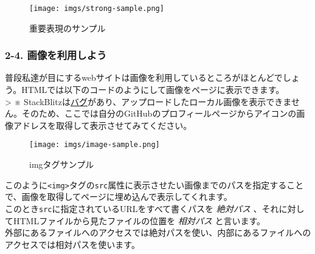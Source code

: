 \begin{Shaded}
\begin{Highlighting}[]
\DataTypeTok{\textless{}}\DataTypeTok{\textgreater{}}
  \DataTypeTok{\textless{}}\DataTypeTok{\textgreater{}}\DataTypeTok{\textless{}/}\DataTypeTok{\textgreater{}}
\DataTypeTok{\textless{}/}\DataTypeTok{\textgreater{}}
\end{Highlighting}
\end{Shaded}

\begin{figure}
\centering
\texttt{[image: imgs/strong-sample.png]}
\caption{重要表現のサンプル}
\end{figure}

\subsubsection{2-4.
画像を利用しよう}\label{ux753bux50cfux3092ux5229ux7528ux3057ux3088ux3046}

普段私達が目にするwebサイトは画像を利用しているところがほとんどでしょう。HTMLでは以下のコードのようにして画像をページに表示できます。\\
\textgreater{} ※
StackBlitzは\href{https://github.com/stackblitz/core/issues/1687}{バグ}があり、アップロードしたローカル画像を表示できません。そのため、ここでは自分のGitHubのプロフィールページからアイコンの画像アドレスを取得して表示させてみてください。

\begin{Shaded}
\begin{Highlighting}[]
\DataTypeTok{\textless{}}\OperatorTok{=}\ErrorTok{\textless{}}\OtherTok{ }\DataTypeTok{/\textgreater{}}
\end{Highlighting}
\end{Shaded}

\begin{figure}
\centering
\texttt{[image: imgs/image-sample.png]}
\caption{imgタグサンプル}
\end{figure}

このように\texttt{\textless{}img\textgreater{}}タグの\texttt{src}属性に表示させたい画像までのパスを指定することで、画像を取得してページに埋め込んで表示してくれます。\\
このとき\texttt{src}に指定されているURLをすべて書くパスを
\emph{絶対パス} 、それに対してHTMLファイルから見たファイルの位置を
\emph{相対パス} と言います。\\
外部にあるファイルへのアクセスでは絶対パスを使い、内部にあるファイルへのアクセスでは相対パスを使います。

